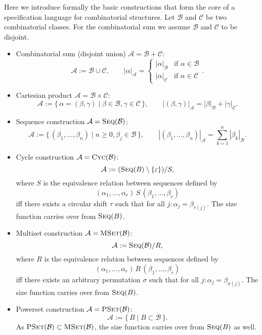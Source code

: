 \begin{definition}
  Here we introduce formally the basic constructions that form the core of a specification language for combinatorial structures. 
  Let $\mathcal{B}$ and $\mathcal{C}$ be two combinatorial classes. For the combinatorial sum we assume $\mathcal{B}$ and $\mathcal{C}$ to be disjoint.
  \begin{itemize}
    \item Combinatorial sum (disjoint union) $\mathcal{A} = \mathcal{B} + \mathcal{C}$:
    $$
      \mathcal{A} := \mathcal{B} \cup \mathcal{C}, \qquad
      |\alpha|_{\mathcal{A}} = \begin{cases}
        |\alpha|_{\mathcal{B}} & \text{if $\alpha \in \mathcal{B}$} \\
        |\alpha|_{\mathcal{C}} & \text{if $\alpha \in \mathcal{C}$}
      \end{cases}.
    $$
    \item Cartesian product $\mathcal{A} = \mathcal{B} \times \mathcal{C}$: 
    $$
      \mathcal{A} := \{\, \alpha = (\beta, \gamma) \mid \beta \in \mathcal{B}, \gamma \in \mathcal{C} \,\}, \qquad
      |(\beta, \gamma)|_{\mathcal{A}} = |\beta|_{\mathcal{B}} + |\gamma|_{\mathcal{C}}.
    $$
    \item Sequence construction $\mathcal{A} = \textsc{Seq}(\mathcal{B})$:
    $$
      \mathcal{A} := \{\, (\beta_1,\dots,\beta_n) \mid n \geq 0, \beta_j \in \mathcal{B} \,\}, \qquad
      |(\beta_1,\dots,\beta_n)|_{\mathcal{A}} = \sum_{k = 1}^n |\beta_k|_{\mathcal{B}}.
    $$
    \item Cycle construction $\mathcal{A} = \textsc{Cyc}(\mathcal{B})$:
    $$
      \mathcal{A} := (\textsc{Seq}(B) \setminus \{\varepsilon\}) / S,
    $$
    where $S$ is the equivalence relation between sequences defined by
    $$
      (\alpha_1,\dots,\alpha_r)\,S\,(\beta_1,\dots,\beta_r)
    $$
    iff there exists a circular shift $\tau$ such that for all $j \colon \alpha_j = \beta_{\tau(j)}$.
    The size function carries over from $\textsc{Seq}(B)$.
    \item Multiset construction $\mathcal{A} = \textsc{MSet}(\mathcal{B})$:
    $$
      \mathcal{A} := \textsc{Seq}(\mathcal{B}) / R,
    $$
    where $R$ is the equivalence relation between sequences defined by
    $$
      (\alpha_1,\dots,\alpha_r)\,R\,(\beta_1,\dots,\beta_r)
    $$
    iff there exists an arbitrary permutation $\sigma$ such that for all $j \colon \alpha_j = \beta_{\sigma(j)}$.
    The size function carries over from $\textsc{Seq}(B)$.
    \item Powerset construction $\mathcal{A} = \textsc{PSet}(\mathcal{B})$:
    $$
    \mathcal{A} := \{\, B \mid B \subset \mathcal{B} \,\}.
    $$
    As $\textsc{PSet}(\mathcal{B}) \subset \textsc{MSet}(\mathcal{B})$, the size function carries over from $\textsc{Seq}(B)$ as well.
  \end{itemize}
\end{definition}

